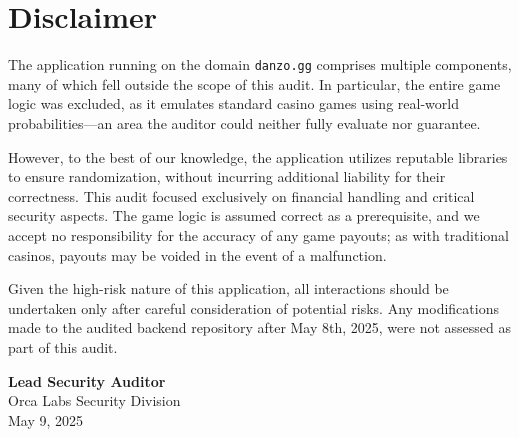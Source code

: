 \documentclass[11pt,a4paper]{article}
\begin{document}
\section{Disclaimer}

The application running on the domain \texttt{danzo.gg} comprises multiple components, many of which fell outside the scope of this audit. In particular, the entire game logic was excluded, as it emulates standard casino games using real-world probabilities—an area the auditor could neither fully evaluate nor guarantee.

However, to the best of our knowledge, the application utilizes reputable libraries to ensure randomization, without incurring additional liability for their correctness. This audit focused exclusively on financial handling and critical security aspects. The game logic is assumed correct as a prerequisite, and we accept no responsibility for the accuracy of any game payouts; as with traditional casinos, payouts may be voided in the event of a malfunction.

Given the high-risk nature of this application, all interactions should be undertaken only after careful consideration of potential risks. Any modifications made to the audited backend repository after May 8th, 2025, were not assessed as part of this audit.

\vspace{2cm}

\noindent\textbf{Lead Security Auditor}\\
Orca Labs Security Division\\
May 9, 2025
\end{document}
